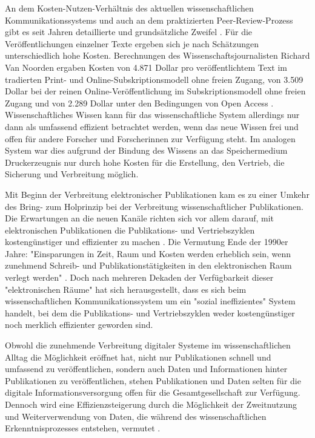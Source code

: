 An dem Kosten-Nutzen-Verhältnis des aktuellen wissenschaftlichen Kommunikationssystems und auch an dem praktizierten Peer-Review-Prozess \cite{Smith_2006} gibt es seit Jahren detaillierte und grundsätzliche Zweifel \cite{Brembs_2013a}. Für die Veröffentlichungen einzelner Texte ergeben sich je nach Schätzungen unterschiedlich hohe Kosten. Berechnungen des Wissenschaftsjournalisten Richard Van Noorden ergaben Kosten von 4.871 Dollar pro veröffentlichtem Text im tradierten Print- und Online-Subskriptionsmodell ohne freien Zugang, von 3.509 Dollar bei der reinen Online-Veröffentlichung im Subskriptionsmodell ohne freien Zugang und von 2.289 Dollar unter den Bedingungen von Open Access \cite{Van_Noorden_2013}. Wissenschaftliches Wissen kann für das wissenschaftliche System allerdings nur dann als umfassend effizient betrachtet werden, wenn das neue Wissen frei und offen für andere Forscher und Forscherinnen zur Verfügung steht. Im analogen System war dies aufgrund der Bindung des Wissens an das Speichermedium Druckerzeugnis nur durch hohe Kosten für die Erstellung, den Vertrieb, die Sicherung und Verbreitung möglich.

Mit Beginn der Verbreitung elektronischer Publikationen kam es zu einer Umkehr des Bring- zum Holprinzip bei der Verbreitung wissenschaftlicher Publikationen. Die Erwartungen an die neuen Kanäle richten sich vor allem darauf, mit elektronischen Publikationen die Publikations- und Vertriebszyklen kostengünstiger und effizienter zu machen \cite{Brueggemann-Klein_1995}. Die Vermutung Ende der 1990er Jahre: "Einsparungen in Zeit, Raum und Kosten werden erheblich sein, wenn zunehmend Schreib- und Publikationstätigkeiten in den elektronischen Raum verlegt werden" \cite{Roberts_1999}. Doch nach mehreren Dekaden der Verfügbarkeit dieser "elektronischen Räume" hat sich herausgestellt, dass es sich beim wissenschaftlichen Kommunikationssystem um ein "sozial ineffizientes" System \cite[:47]{Mueller-Langer_2010} handelt, bei dem die Publikations- und Vertriebszyklen weder kostengünstiger noch merklich effizienter geworden sind.

Obwohl die zunehmende Verbreitung digitaler Systeme im wissenschaftlichen Alltag die Möglichkeit eröffnet hat, nicht nur Publikationen schnell und umfassend zu veröffentlichen, sondern auch Daten und Informationen hinter Publikationen zu veröffentlichen, stehen Publikationen und Daten selten für die digitale Informationsversorgung offen für die Gesamtgesellschaft zur Verfügung. Dennoch wird eine Effizienzsteigerung durch die Möglichkeit der Zweitnutzung und Weiterverwendung von Daten, die während des wissenschaftlichen Erkenntnisprozesses entstehen, vermutet \cite{RIN_2010_open_research}.

